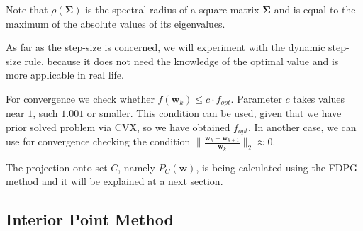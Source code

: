 \documentclass{beamer}
\begin{document}
\begin{frame}

\justifying
Note that $\rho\left(\mathbf{\Sigma}\right)$ is the spectral radius of a square matrix $\mathbf{\Sigma}$ and is equal to the maximum of the absolute values of its eigenvalues.

\vspace{0.6cm}
\justifying
As far as the step-size is concerned, we will experiment with the dynamic step-size rule, because it does not need the knowledge of the optimal value and is more applicable in real life.

\vspace{0.6cm}
\justifying
For convergence we check whether $f\left(\mathbf{w}_{k}\right) \leq c \cdot f_{opt}$. Parameter $c$ takes values near $1$, such $1.001$ or smaller. This condition can be used, given that we have prior solved problem via CVX, so we have obtained $f_{opt}$. In another case, we can use for convergence checking the condition $\|\frac{\mathbf{w}_{k} - \mathbf{w}_{k+1}}{\mathbf{w}_{k}}\|_{2} \approx 0$.

\vspace{0.6cm}
\justifying
The projection onto set $C$, namely $P_{C}\left(\mathbf{w}\right)$, is being calculated using the FDPG method and it will be explained at a next section.

\end{frame}





\subsection{Interior Point Method}
\end{document}
